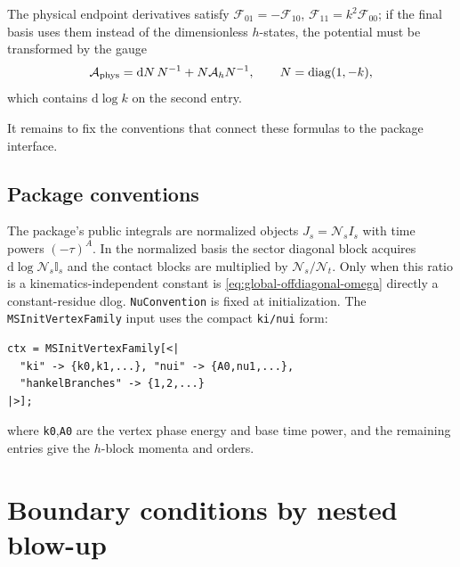 \documentclass[11pt,a4paper]{article}
\newcommand{\dd}{\mathrm d}
\newcommand{\Id}{\mathbb I}
\newcommand{\diag}{\operatorname{diag}}
\begin{document}
The physical endpoint derivatives satisfy $\mathcal F_{01}=-\mathcal F_{10}$,
$\mathcal F_{11}=k^2\mathcal F_{00}$; if the final basis uses them instead of the dimensionless
$h$-states, the potential must be transformed by the gauge
\begin{equation}
  \mathcal A_{\rm phys}=\dd N\,N^{-1}+N\mathcal A_hN^{-1},
  \qquad
  N=\diag(1,-k),
\end{equation}
which contains $\dd\log k$ on the second entry.

It remains to fix the conventions that connect these formulas to the package interface.

\subsection{Package conventions}
\label{sec:package}

The package's public integrals are normalized objects $J_s=\mathcal N_sI_s$ with time powers
$(-\tau)^A$. In the normalized basis the sector diagonal block acquires $\dd\log\mathcal N_s\Id_s$
and the contact blocks are multiplied by $\mathcal N_s/\mathcal N_t$. Only when this ratio is a
kinematics-independent constant is \eqref{eq:global-offdiagonal-omega} directly a
constant-residue dlog. \texttt{NuConvention} is fixed at initialization. The
\texttt{MSInitVertexFamily} input uses the compact \texttt{ki/nui} form:
\begin{verbatim}
ctx = MSInitVertexFamily[<|
  "ki" -> {k0,k1,...}, "nui" -> {A0,nu1,...},
  "hankelBranches" -> {1,2,...}
|>];
\end{verbatim}
where \texttt{k0},\texttt{A0} are the vertex phase energy and base time power, and the remaining
entries give the $h$-block momenta and orders.

\section{Boundary conditions by nested blow-up}
\label{sec:boundary}
\end{document}
